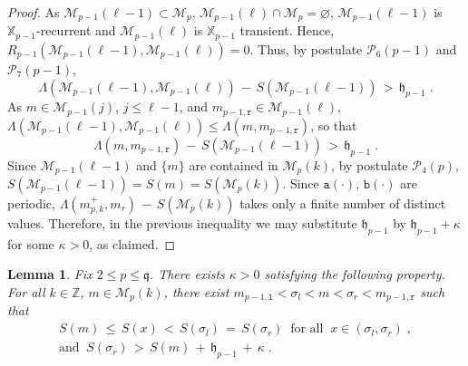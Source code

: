 \documentclass[reqno]{amsart}
\theoremstyle{plain}
\newtheorem{lemma}[theorem]{Lemma}
\theoremstyle{definition}
\newcommand{\mc}[1]{{\mathcal #1}}
\newcommand{\mf}[1]{{\mathfrak #1}}
\newcommand{\bb}[1]{{\mathbb #1}}
\newcommand{\ms}[1]{{\mathscr #1}}
\newcommand{\mtt}[1]{{\mathtt #1}}
\newcounter{as}[section]
\newcommand{\<}{\langle}
\renewcommand{\>}{\rangle}
\begin{document}
\begin{proof}
As $\ms M_{p-1}(\ell-1) \subset \ms M_p$,
$\ms M_{p-1}(\ell) \cap \ms M_p = \varnothing$, $\ms M_{p-1}(\ell-1)$
is $\bb X_{p-1}$-recurrent and $\ms M_{p-1}(\ell)$ is $\bb X_{p-1}$
transient. Hence,
$R_{p-1} (\ms M_{p-1}(\ell-1), \ms M_{p-1}(\ell))=0$. Thus, by
postulate $\mc P_6(p-1)$ and $\mc P_7(p-1)$,
\begin{equation*}
\Lambda (\ms M_{p-1}(\ell-1), \ms M_{p-1}(\ell))
\,-\, S(\ms M_{p-1}(\ell-1)) \,> \, \mf h_{p-1}\;.
\end{equation*}
As $m\in \ms M_{p-1}(j)$, $j\le \ell -1$, and $m_{p-1, \mtt r}\in \ms
M_{p-1}(\ell)$, $\Lambda (\ms M_{p-1}(\ell-1), \ms M_{p-1}(\ell)) \le
\Lambda (m, m_{p-1, \mtt r})$, so that
\begin{equation*}
\Lambda (m, m_{p-1, \mtt r})
\,-\, S(\ms M_{p-1}(\ell-1)) \,> \, \mf h_{p-1}\;.
\end{equation*}
Since $\ms M_{p-1}(\ell-1)$ and $\{m\}$ are contained in
$\ms M_{p}(k)$, by postulate $\mc P_4(p)$,
$S(\ms M_{p-1}(\ell-1)) = S(m) = S(\ms M_{p}(k))$. Since
$\mtt a(\cdot)$, $\mtt b(\cdot)$ are periodic,
$\Lambda (m^+_{p,k}, m_r) \,-\, S(\ms M_p(k)) $ takes only a finite
number of distinct values. Therefore, in the previous inequality we
may substitute $\mf h_{p-1}$ by $\mf h_{p-1}+\kappa$ for some
$\kappa>0$, as claimed.
\end{proof}

\begin{lemma}
\label{l35}
Fix $2\le p\le \mf q$. There exists $\kappa>0$ satisfying the
following property.  For all $k\in \bb Z$, $m\in \ms M_p(k)$, there
exist $m_{p-1, \mtt l} < \sigma_l < m < \sigma_r < m_{p-1, \mtt r}$
such that
\begin{equation}
\label{46}
\begin{gathered}
S(m) \,\le\, S(x) \, < \,  S(\sigma_l)  \,=\, S(\sigma_r)
\;\;
\text{for all}\;\; x\in (\sigma_l,\sigma_r) \;,
\\
\text{and}\;\; 
S(\sigma_r) \,>\, S(m) \,+\, \mf h_{p-1} \,+\, \kappa \;.
\end{gathered}
\end{equation}
\end{lemma}
\end{document}
